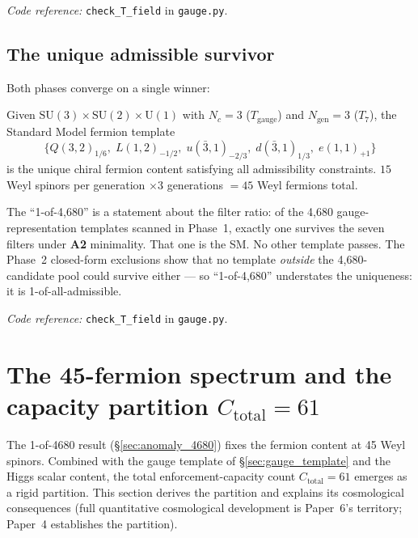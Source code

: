 \documentclass[11pt]{article}
\newcommand{\coderef}[2]{\smallskip\noindent\textit{Code reference:} \texttt{#1} in \texttt{#2}.}
\newcommand{\SU}{\mathrm{SU}}
\newcommand{\Un}{\mathrm{U}}
\newcommand{\epitag}[1]{\textbf{[#1]}}
\newcommand{\Atwo}{\textbf{A2}}
\theoremstyle{definition}
\begin{document}
\coderef{check\_T\_field}{gauge.py}

\subsection{The unique admissible survivor}\label{sec:4680_survivor}

Both phases converge on a single winner:

\begin{tcolorbox}[apfbox, title={$T_{\mathrm{field}}$ (SM fermion content) \epitag{P}}]
Given $\SU(3)\times\SU(2)\times\Un(1)$ with $N_c = 3$ ($T_{\mathrm{gauge}}$) and $N_{\mathrm{gen}} = 3$ ($T_7$), the Standard Model fermion template
\[
\{Q(3, 2)_{1/6}, \; L(1, 2)_{-1/2}, \; u(\bar 3, 1)_{-2/3}, \; d(\bar 3, 1)_{1/3}, \; e(1, 1)_{+1}\}
\]
is the unique chiral fermion content satisfying all admissibility constraints. $15$ Weyl spinors per generation $\times 3$ generations $= 45$ Weyl fermions total.
\end{tcolorbox}

The ``1-of-4{,}680'' is a statement about the filter ratio: of the 4{,}680 gauge-representation templates scanned in Phase~1, exactly one survives the seven filters under \Atwo{} minimality. That one is the SM. No other template passes. The Phase~2 closed-form exclusions show that no template \emph{outside} the 4{,}680-candidate pool could survive either --- so ``1-of-4{,}680'' understates the uniqueness: it is 1-of-all-admissible.

\coderef{check\_T\_field}{gauge.py}

\section{The 45-fermion spectrum and the capacity partition \texorpdfstring{$C_{\mathrm{total}} = 61$}{Ctotal = 61}}\label{sec:capacity_61}

The 1-of-4680 result (\S\ref{sec:anomaly_4680}) fixes the fermion content at 45 Weyl spinors. Combined with the gauge template of \S\ref{sec:gauge_template} and the Higgs scalar content, the total enforcement-capacity count $C_{\mathrm{total}} = 61$ emerges as a rigid partition. This section derives the partition and explains its cosmological consequences (full quantitative cosmological development is Paper~6's territory; Paper~4 establishes the partition).
\end{document}

